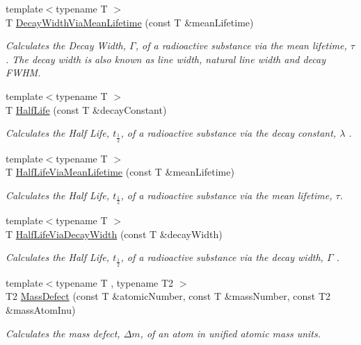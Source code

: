 \begin{DoxyCompactItemize}
{\footnotesize template$<$typename T $>$ }\\T \hyperlink{group___decay_width_ga0b65d991f3f3d72cf09a4a7b343a01ca}{Decay\+Width\+Via\+Mean\+Lifetime} (const T \&mean\+Lifetime)
\begin{DoxyCompactList}\small\item\em Calculates the Decay Width, $\Gamma$, of a radioactive substance via the mean lifetime, $\tau$. The decay width is also known as line width, natural line width and decay F\+W\+HM. \end{DoxyCompactList}\item 
{\footnotesize template$<$typename T $>$ }\\T \hyperlink{group___half_life_ga21d268f154fb91c1c556bbfa7fe83ac1}{Half\+Life} (const T \&decay\+Constant)
\begin{DoxyCompactList}\small\item\em Calculates the Half Life, $t_{\frac{1}{2}}$, of a radioactive substance via the decay constant, $\lambda$ . \end{DoxyCompactList}\item 
{\footnotesize template$<$typename T $>$ }\\T \hyperlink{group___half_life_gacddef16b62e98b214ec8dd8af7da7dce}{Half\+Life\+Via\+Mean\+Lifetime} (const T \&mean\+Lifetime)
\begin{DoxyCompactList}\small\item\em Calculates the Half Life, $t_{\frac{1}{2}}$, of a radioactive substance via the mean lifetime, $\tau$. \end{DoxyCompactList}\item 
{\footnotesize template$<$typename T $>$ }\\T \hyperlink{group___half_life_gaba3fda944d1a68ee1016a1f2f5809359}{Half\+Life\+Via\+Decay\+Width} (const T \&decay\+Width)
\begin{DoxyCompactList}\small\item\em Calculates the Half Life, $t_{\frac{1}{2}}$, of a radioactive substance via the decay width, $\Gamma$ . \end{DoxyCompactList}\item 
{\footnotesize template$<$typename T , typename T2 $>$ }\\T2 \hyperlink{group___mass_defect_gae89f2dfa65992c0314adc2440b2f582a}{Mass\+Defect} (const T \&atomic\+Number, const T \&mass\+Number, const T2 \&mass\+Atom\+Inu)
\begin{DoxyCompactList}\small\item\em Calculates the mass defect, $\Delta m$, of an atom in unified atomic mass units. \end{DoxyCompactList}\item 

\end{DoxyCompactItemize}
